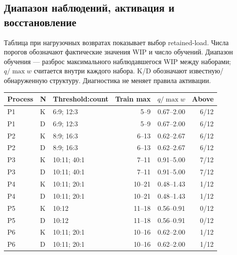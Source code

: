 \clearpage

\subsection{Диапазон наблюдений, активация и восстановление}

Таблица при нагрузочных возвратах показывает выбор retained-load. Числа порогов обозначают фактические значения WIP и число обучений. Диапазон обучения — разброс максимального наблюдавшегося WIP между наборами; $q/\max w$ считается внутри каждого набора. K/D обозначают известную/обнаруженную структуру. Диагностика не меняет правила активации.

\begin{center}\small\setlength{\tabcolsep}{3pt}\begin{tabular}{llp{}rrr}\toprule

Process & N & Threshold:count & Train max & $q/\max w$ & Above\\\midrule

P1 & K & 6:9; 12:3 & 5--9 & 0.67--2.00 & 6/12\\

P1 & D & 6:9; 12:3 & 5--9 & 0.67--2.00 & 6/12\\

P2 & K & 8:9; 16:3 & 6--13 & 0.62--2.67 & 6/12\\

P2 & D & 8:9; 16:3 & 6--13 & 0.62--2.67 & 6/12\\

P3 & K & 10:11; 40:1 & 7--11 & 0.91--5.00 & 7/12\\

P3 & D & 10:11; 40:1 & 7--11 & 0.91--5.00 & 7/12\\

P4 & K & 10:11; 20:1 & 10--21 & 0.48--1.43 & 1/12\\

P4 & D & 10:11; 20:1 & 10--21 & 0.48--1.43 & 1/12\\

P5 & K & 10:12 & 11--18 & 0.56--0.91 & 0/12\\

P5 & D & 10:12 & 11--18 & 0.56--0.91 & 0/12\\

P6 & K & 10:11; 20:1 & 10--16 & 0.62--2.00 & 1/12\\

P6 & D & 10:11; 20:1 & 10--16 & 0.62--2.00 & 1/12\\

\bottomrule\end{tabular}\end{center}

